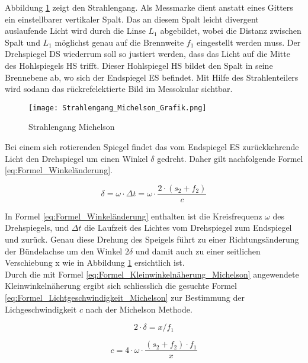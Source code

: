 Abbildung \ref{fig:Strahlengang Michelson} zeigt den Strahlengang. Als Messmarke dient anstatt eines Gitters ein einstellbarer vertikaler Spalt. Das an diesem Spalt leicht divergent auslaufende Licht wird durch die Linse $L_{1}$ abgebildet, wobei die Distanz zwischen Spalt und $L_{1}$ möglichst genau auf die Brennweite $f_{1}$ eingestellt werden muss. Der Drehspiegel DS wiederrum soll so justiert werden, dass das Licht auf die Mitte des Hohlspiegels HS trifft. Dieser Hohlspiegel HS bildet den Spalt in seine Brennebene ab, wo sich der Endspiegel ES befindet. Mit Hilfe des Strahlenteilers wird sodann das rückrefelektierte Bild im Messokular sichtbar.

\begin{figure}[htb]
\texttt{[image: Strahlengang\_Michelson\_Grafik.png]}
\caption{Strahlengang Michelson}
\label{fig:Strahlengang Michelson}
\end{figure}

Bei einem sich rotierenden Spiegel findet das vom Endspiegel ES zurückkehrende Licht den Drehspiegel um einen Winkel $\delta$ gedreht. Daher gilt nachfolgende Formel \ref{eq:Formel_Winkeländerung}.

\begin{equation}
\delta = \omega\cdot\Delta t = \omega\cdot\dfrac{2\cdot(s_{2}+f_{2})}{c}
\label{eq:Formel_Winkeländerung}
\end{equation}

In Formel \ref{eq:Formel_Winkeländerung} enthalten ist die Kreisfrequenz $\omega$ des Drehspiegels, und $\Delta t$ die Laufzeit des Lichtes vom Drehspiegel zum Endspiegel und zurück. Genau diese Drehung des Speigels führt zu einer Richtungsänderung der Bündelachse um den Winkel $2\delta$ und damit auch zu einer seitlichen Verschiebung x wie in Abbildung \ref{fig:Strahlengang Michelson} ersichtlich ist.\\
Durch die mit Formel \ref{eq:Formel_Kleinwinkelnäherung_Michelson} angewendete Kleinwinkelnäherung ergibt sich schliesslich die gesuchte Formel \ref{eq:Formel_Lichtgeschwindigkeit_Michelson} zur Bestimmung der Lichgeschwindigkeit $c$ nach der Michelson Methode.

\begin{equation}
2\cdot\delta = x/f_{1}
\label{eq:Formel_Kleinwinkelnäherung_Michelson}
\end{equation}

\begin{equation}
c = 4\cdot\omega\cdot\dfrac{(s_{2}+f_{2})\cdot f_{1}}{x}
\label{eq:Formel_Lichtgeschwindigkeit_Michelson}
\end{equation}


